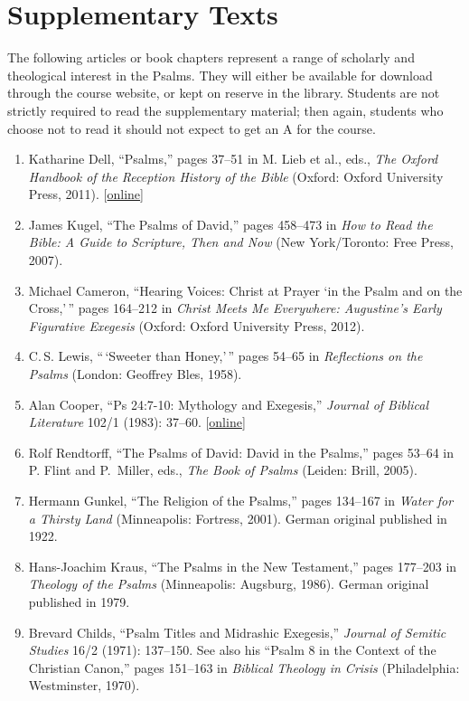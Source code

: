 \documentclass[titlepage]{article}
\begin{document}
\section{Supplementary Texts}
\label{supplementary}

The following articles or book chapters represent a range of scholarly
and theological interest in the Psalms. They will either be available
for download through the course website, or kept on reserve in the
library. Students are not strictly required to read the supplementary
material; then again, students who choose not to read it should not
expect to get an A for the course.

\begin{enumerate}
 \item Katharine Dell, “Psalms,” pages 37--51 in M. Lieb et al., eds., \emph{The Oxford Handbook of the Reception History of the Bible} (Oxford: Oxford University Press, 2011). [\href{http://ezproxy.mytyndale.ca:2048/login?url=http://www.oxfordhandbooks.com/view/10.1093/oxfordhb/9780199204540.001.0001/oxfordhb-9780199204540-e-4}{online}]
 \item James Kugel, “The Psalms of David,” pages 458–473 in \emph{How to Read the Bible: A Guide to Scripture, Then and Now} (New York/Toronto: Free Press, 2007).
 \item Michael Cameron, ``Hearing Voices: Christ at Prayer `in the Psalm and on the Cross,'\,'' pages 164--212 in \emph{Christ Meets Me Everywhere: Augustine's Early Figurative Exegesis} (Oxford: Oxford University Press, 2012).
 \item C.\,S. Lewis, ``\,`Sweeter than Honey,'\,'' pages 54--65 in \emph{Reflections on the Psalms} (London: Geoffrey Bles, 1958).
 \item Alan Cooper, ``Ps 24:7-10: Mythology and Exegesis,'' \emph{Journal of Biblical Literature} 102/1 (1983): 37--60. [\href{http://www.jstor.org/stable/3260745}{online}]
 \item Rolf Rendtorff, “The Psalms of David: David in the Psalms,” pages 53–64 in P. Flint and P.~Miller, eds., \emph{The Book of Psalms} (Leiden: Brill, 2005).
 \item Hermann Gunkel, “The Religion of the Psalms,” pages 134–167 in \emph{Water for a Thirsty Land} (Minneapolis: Fortress, 2001). German original published in 1922.
 \item Hans-Joachim Kraus, “The Psalms in the New Testament,” pages 177–203 in \emph{Theology of the Psalms} (Minneapolis: Augsburg, 1986). German original published in 1979.
 \item Brevard Childs, “Psalm Titles and Midrashic Exegesis,” \emph{Journal of Semitic Studies} 16/2 (1971): 137--150. See also his “Psalm 8 in the Context of the Christian Canon,” pages 151–163 in \emph{Biblical Theology in Crisis} (Philadelphia: Westminster, 1970).

\end{enumerate}
\end{document}
